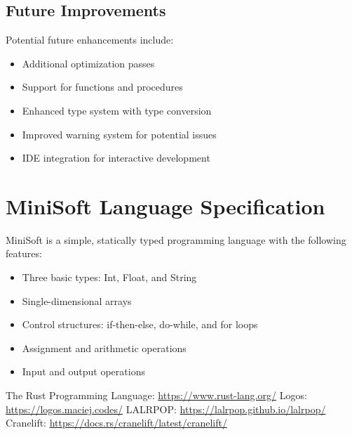 \documentclass[12pt,a4paper]{article}
\begin{document}
\subsection{Future Improvements}
Potential future enhancements include:
\begin{itemize}
	\item Additional optimization passes
	\item Support for functions and procedures
	\item Enhanced type system with type conversion
	\item Improved warning system for potential issues
	\item IDE integration for interactive development
\end{itemize}

\appendix
\section{MiniSoft Language Specification}
MiniSoft is a simple, statically typed programming language with the following features:
\begin{itemize}
	\item Three basic types: Int, Float, and String
	\item Single-dimensional arrays
	\item Control structures: if-then-else, do-while, and for loops
	\item Assignment and arithmetic operations
	\item Input and output operations
\end{itemize}

\begin{thebibliography}{9}
	 The Rust Programming Language: \url{https://www.rust-lang.org/}
	 Logos: \url{https://logos.maciej.codes/}
	 LALRPOP: \url{https://lalrpop.github.io/lalrpop/}
	 Cranelift: \url{https://docs.rs/cranelift/latest/cranelift/}
\end{thebibliography}
\end{document}
